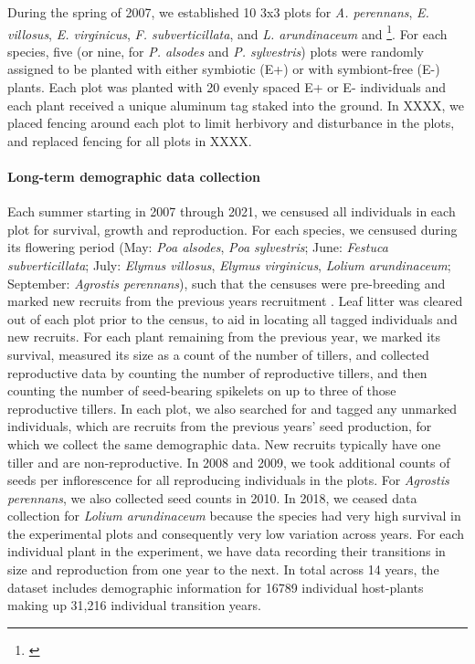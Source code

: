 \documentclass[12pt]{article}
\newcommand{\tom}[2]{{\color{red}{#1}}\footnote{\textit{\color{red}{#2}}}}
\begin{document}
During the spring of 2007, we established 10 3x3 plots for \emph{A. perennans}, \emph{E. villosus}, \emph{E. virginicus}, \emph{F. subverticillata}, and \emph{L. arundinaceum}  and \tom{18 plots for \emph{P. alsodes} and \emph{P. sylvestris}}{I think one set was started in 2007 and another in 2008.}. 
For each species, five (or nine, for \emph{P. alsodes} and \emph{P. sylvestris}) plots were randomly assigned to be planted with either symbiotic (E+) or with symbiont-free (E-) plants.
Each plot was planted with 20 evenly spaced E+ or E- individuals and each plant received a unique aluminum tag staked into the ground. 
In XXXX, we placed fencing around each plot to limit herbivory and disturbance in the plots, and replaced fencing for all plots in XXXX.



\paragraph*{Long-term demographic data collection}
Each summer starting in 2007 through 2021, we censused all individuals in each plot for survival, growth and reproduction. 
For each species, we censused during its flowering period (May: \emph{Poa alsodes}, \emph{Poa sylvestris}; June: \emph{Festuca subverticillata}; July: \emph{Elymus villosus}, \emph{Elymus virginicus}, \emph{Lolium arundinaceum}; September: \emph{Agrostis perennans}), such that the censuses were pre-breeding and marked new recruits from the previous years recruitment .
Leaf litter was cleared out of each plot prior to the census, to aid in locating all tagged individuals and new recruits.
For each plant remaining from the previous year, we marked its survival, measured its size as a count of the number of tillers, and collected reproductive data by counting the number of reproductive tillers, and then counting the number of seed-bearing spikelets on up to three of those reproductive tillers. 
In each plot, we also searched for and tagged any unmarked individuals, which are recruits from the previous years' seed production, for which we collect the same demographic data.
New recruits typically have one tiller and are non-reproductive. 
In 2008 and 2009, we took additional counts of seeds per inflorescence for all reproducing individuals in the plots. 
For \emph{Agrostis perennans}, we also collected seed counts in 2010.
In 2018, we ceased data collection  for \emph{Lolium arundinaceum} because the species had very high survival in the experimental plots and consequently very low variation across years.
For each individual plant in the experiment, we have data recording their transitions in size and reproduction from one year to the next. 
In total across 14 years, the dataset includes demographic information for 16789 individual host-plants making up 31,216 individual transition years.
\end{document}
